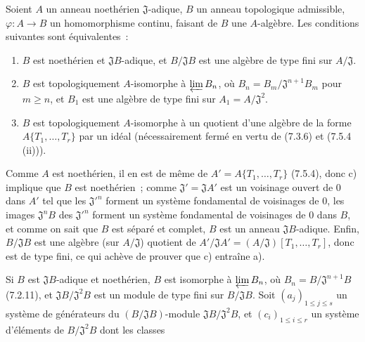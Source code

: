 \begin{proposition}[7.5.5]
\label{0.7.5.5-fr}
Soient $A$ un anneau noethérien $\mathfrak J$-adique, $B$ un anneau topologique
admissible, $\varphi:A\to B$ un homomorphisme continu, faisant de $B$ une
$A$-algèbre. Les conditions suivantes sont équivalentes~:
\begin{enumerate}
  \item[a)] $B$ est noethérien et $\mathfrak JB$-adique, et
  $B/\mathfrak JB$ est une algèbre de type fini sur $A/\mathfrak J$.

  \item[b)] $B$ est topologiquement $A$-isomorphe à $\varprojlim B_n$, où
  $B_n=B_m/\mathfrak J^{n+1}B_m$ pour $m\geq n$, et $B_1$ est une algèbre de
  type fini sur $A_1=A/\mathfrak J^2$.

  \item[c)] $B$ est topologiquement $A$-isomorphe à un quotient d'une algèbre
  de la forme\linebreak $A\{T_1,\ldots,T_r\}$ par un idéal (nécessairement fermé en vertu
  de (7.3.6) et (7.5.4 (ii))).
\end{enumerate}
\end{proposition}

Comme $A$ est noethérien, il en est de même de
$A'=A\{T_1,\ldots,T_r\}$ (7.5.4), donc c) implique que $B$ est noethérien~;
comme $\mathfrak J'=\mathfrak JA'$ est un voisinage ouvert de 0 dans $A'$ tel
que les $\mathfrak J'^{n}$ forment un système fondamental de voisinages de 0,
les images $\mathfrak J^nB$ des $\mathfrak J'^{n}$ forment un système
fondamental de voisinages de 0 dans $B$, et comme on sait que $B$ est séparé et
complet, $B$ est un anneau $\mathfrak JB$-adique. Enfin, $B/\mathfrak JB$ est
une algèbre (sur $A/\mathfrak J$) quotient de
$A'/\mathfrak JA'=(A/\mathfrak J)[T_1,\ldots,T_r]$, donc est de type fini, ce
qui achève de prouver que c) entraîne a).

Si $B$ est $\mathfrak JB$-adique et noethérien, $B$ est isomorphe à
$\varprojlim B_n$, où $B_n=B/\mathfrak J^{n+1}B$ (7.2.11), et
$\mathfrak JB/\mathfrak J^2B$ est un module de type fini sur
$B/\mathfrak JB$. Soit $(a_j)_{1\leq j\leq s}$ un système de générateurs du
$(B/\mathfrak JB)$-module $\mathfrak JB/\mathfrak J^2B$, et
$(c_i)_{1\leq i\leq r}$ un système d'éléments de $B/\mathfrak J^2B$ dont les
classes

